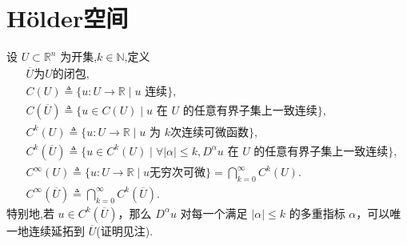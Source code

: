 \documentclass[../../main.tex]{subfiles}
\begin{document}
\section{H\"older空间}\label{section:ch05-H\"older空间}

\begin{definition}
设 $U\subset\mathbb{R}^{n}$ 为开集,$k\in \mathbb{N}$,定义
\begin{align*}
&\overline{U}\text{为}U\text{的闭包},
\\
&C(U) \triangleq \{u: U \to \mathbb{R} \mid u \text{ 连续}\}, \\
&C(\overline{U}) \triangleq \{u \in C(U) \mid u \text{ 在 } U \text{ 的任意有界子集上一致连续}\}, \\
&C^k(U) \triangleq \{u: U \to \mathbb{R} \mid u \text{ 为 } k \text{次连续可微函数}\}, \\
&C^k(\overline{U}) \triangleq \{u \in C^k(U) \mid \forall |\alpha| \leqslant k, D^\alpha u\text{ 在 } U \text{ 的任意有界子集上一致连续}\},
\\
&C^\infty(U) \triangleq \{u : U \to \mathbb{R} \mid u \text{无穷次可微}\} = \bigcap\limits_{k=0}^{\infty} C^k(U). \\
&C^\infty(\overline{U}) \triangleq \bigcap\limits_{k=0}^{\infty} C^k(\overline{U}).
\end{align*}
特别地,若 \(u \in C^k(\overline{U})\)，那么 \(D^\alpha u\) 对每一个满足 \(|\alpha| \leqslant k\) 的多重指标 \(\alpha\)，可以唯一地连续延拓到 \(\overline{U}\)(证明见注).
\end{definition}
\end{document}
